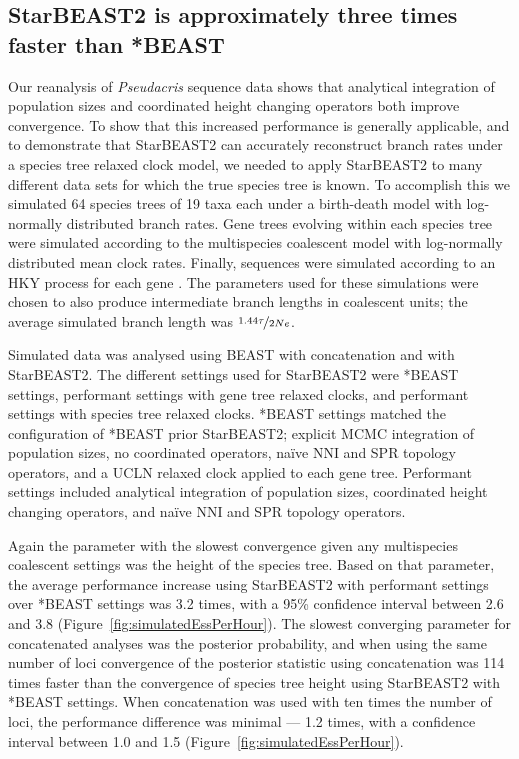 \documentclass[12pt]{article}
\begin{document}
\subsection*{StarBEAST2 is approximately three times faster than *BEAST}

Our reanalysis of \textit{Pseudacris} sequence data shows that analytical
integration of population sizes and coordinated height changing operators both
improve convergence. To show that this increased performance is generally
applicable, and to demonstrate that StarBEAST2 can accurately reconstruct branch
rates under a species tree relaxed clock model, we needed to apply StarBEAST2 to
many different data sets for which the true species tree is known. To accomplish
this we simulated 64 species trees of 19 taxa each under a birth-death model
with log-normally distributed branch rates. Gene trees evolving within each
species tree were simulated according to the multispecies coalescent model with
log-normally distributed mean clock rates. Finally, sequences were simulated
according to an HKY process for each gene \citep{Hasegawa1985, Goldman1993}. The
parameters used for these simulations were chosen to also produce intermediate
branch lengths in coalescent units; the average simulated branch length was
$\nicefrac{1.44\tau}{2Ne}$.

Simulated data was analysed using BEAST with concatenation and with StarBEAST2.
The different settings used for StarBEAST2 were *BEAST settings, performant
settings with gene tree relaxed clocks, and performant settings with species
tree relaxed clocks. *BEAST settings matched the configuration of *BEAST prior
StarBEAST2; explicit MCMC integration of population sizes, no coordinated
operators, na\"ive NNI and SPR topology operators, and a UCLN relaxed clock
applied to each gene tree. Performant settings included analytical integration of
population sizes, coordinated height changing operators, and na\"ive NNI and SPR
topology operators.

Again the parameter with the slowest convergence given any multispecies coalescent
settings was the height of the species tree. Based on that parameter, the
average performance increase using StarBEAST2 with performant settings over
*BEAST settings was 3.2 times, with a 95\% confidence interval between 2.6 and
3.8 (Figure~\ref{fig:simulatedEssPerHour}). The slowest converging parameter for
concatenated analyses was the posterior probability, and when using the same number
of loci convergence of the posterior statistic using concatenation was
114 times faster than the convergence of species tree height
using StarBEAST2 with *BEAST settings. When concatenation was used with ten
times the number of loci, the performance difference was minimal --- 1.2 times,
with a confidence interval between 1.0 and 1.5 (Figure~\ref{fig:simulatedEssPerHour}).
\end{document}
